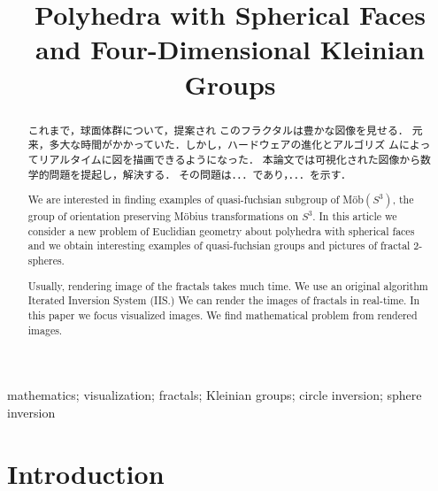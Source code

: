\documentclass[dvipdfmx]{interact}
\theoremstyle{plain}%
\theoremstyle{definition}
\theoremstyle{remark}
\theoremstyle{problemstyle}
\begin{document}

\title{Polyhedra with Spherical Faces and Four-Dimensional Kleinian Groups}

\author{
}

\maketitle

\begin{abstract}
 これまで，球面体群について，提案され
 このフラクタルは豊かな図像を見せる．
 元来，多大な時間がかかっていた．しかし，ハードウェアの進化とアルゴリズ
 ムによってリアルタイムに図を描画できるようになった．
 本論文では可視化された図像から数学的問題を提起し，解決する．
 その問題は．．．であり，．．．を示す．

 We are interested in finding examples of quasi-fuchsian subgroup of
 M\"ob$(S^3)$, the group of orientation preserving M\"obius
 transformations on $S^3$. In this article we consider a new problem of
 Euclidian geometry about polyhedra with spherical faces and we obtain
 interesting examples of quasi-fuchsian groups and pictures of fractal
 2-spheres.

 Usually, rendering image of the fractals takes much time.
 We use an original algorithm Iterated Inversion System (IIS.)
 We can render the images of fractals in real-time.
 In this paper we focus visualized images.
 We find mathematical problem from rendered images.
\end{abstract}

\begin{keywords}
mathematics; visualization; fractals; Kleinian groups; circle inversion;
 sphere inversion
\end{keywords}

\tableofcontents

\section{Introduction}
\end{document}
